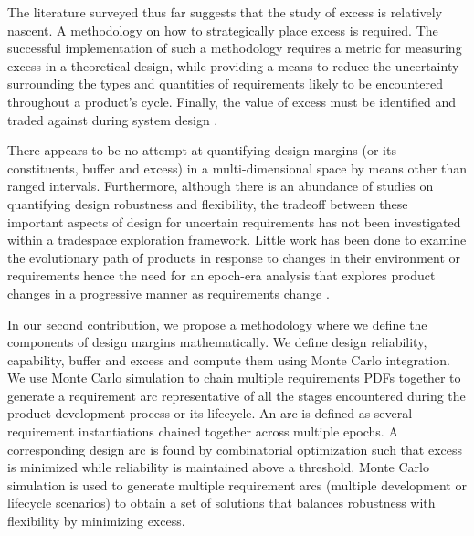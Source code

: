 
The literature surveyed thus far suggests that the study of excess is relatively nascent. A methodology on how to strategically place excess is required. The successful implementation of such a methodology requires a metric for measuring excess in a theoretical design, while providing a means to reduce the uncertainty surrounding the types and quantities of requirements likely to be encountered throughout a product's cycle. Finally, the value of excess must be identified and traded against during system design \cite{Long2017}.

There appears to be no attempt at quantifying design margins (or its constituents, buffer and excess) in a multi-dimensional space by means other than ranged intervals. Furthermore, although there is an abundance of studies on quantifying design robustness and flexibility, the tradeoff between these important aspects of design for uncertain requirements has not been investigated within a tradespace exploration framework. Little work has been done to examine the evolutionary path of products in response to changes in their environment or requirements hence the need for an epoch-era analysis that explores product changes in a progressive manner as requirements change \cite{Long2017,Cardin2017}. 

In our second contribution, we propose a methodology where we define the components of design margins mathematically. We define design reliability, capability, buffer and excess and compute them using Monte Carlo integration. We use Monte Carlo simulation to chain multiple requirements \acp{PDF} together to generate a requirement arc representative of all the stages encountered during the product development process or its lifecycle. An arc is defined as several requirement instantiations chained together across multiple epochs. A corresponding design arc is found by combinatorial optimization such that excess is minimized while reliability is maintained above a threshold. Monte Carlo simulation is used to generate multiple requirement arcs (multiple development or lifecycle scenarios) to obtain a set of solutions that balances robustness with flexibility by minimizing excess.

